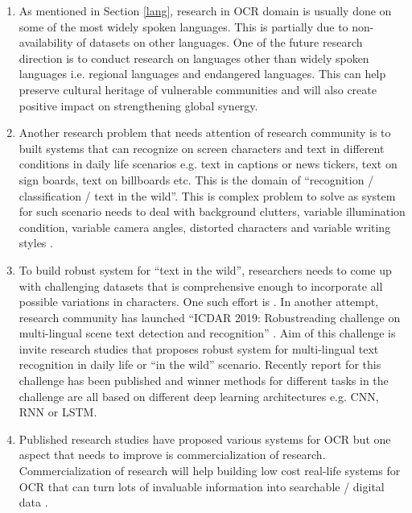 \documentclass{article}
\begin{document}
\begin{enumerate}

\item As mentioned in Section \ref{lang}, research in OCR domain is usually done on some of the most widely spoken languages. This is partially due to non-availability of datasets on other languages. One of the future research direction is to conduct research on languages other than widely spoken languages i.e. regional languages and endangered languages. This can help preserve cultural heritage of vulnerable communities and will also create positive impact on strengthening global synergy.  


\item Another research problem that needs attention of research community is to built systems that can recognize on screen characters and text in different conditions in daily life scenarios e.g. text in captions or news tickers, text on sign boards, text on billboards etc. This is the domain of ``recognition / classification / text in the wild''. This is complex problem to solve as system for such scenario needs to deal with background clutters, variable illumination condition, variable camera angles, distorted characters and variable writing styles \cite{long2018}.

\item To build robust system for ``text in the wild'', researchers needs to come up with challenging datasets that is comprehensive enough to incorporate all possible variations in characters. One such effort is \cite{Yuan2019}. In another attempt, research community has launched ``ICDAR 2019: Robustreading challenge on multi-lingual scene text detection and recognition'' \cite{2019arXiv190700945N}. Aim of this challenge is invite research studies that proposes robust system for multi-lingual text recognition in daily life or ``in the wild'' scenario. Recently report for this challenge has been published and winner methods for different tasks in the challenge are all based on different deep learning architectures e.g. CNN, RNN or LSTM. 


\item Published research studies have proposed various systems for OCR but one aspect that needs to improve is commercialization of research. Commercialization of research will help building low cost real-life systems for OCR that can turn lots of invaluable information into searchable / digital data \cite{comm2008}.

\end{enumerate}
\end{document}
